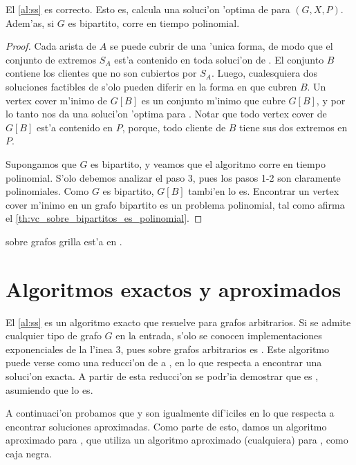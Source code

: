 \begin{theorem}
El \autoref{al:ss} es correcto. Esto es, calcula una soluci'on 'optima de  para $(G, X, P)$. Adem'as, si $G$ es bipartito, corre en tiempo polinomial.
\begin{proof}
Cada arista de $A$ se puede cubrir de una 'unica forma, de modo que el conjunto de extremos $S_A$ est'a contenido en toda soluci'on de . El conjunto $B$ contiene los clientes que no son cubiertos por $S_A$. Luego, cualesquiera dos soluciones factibles de  s'olo pueden diferir en la forma en que cubren $B$. Un vertex cover m'inimo de $G[B]$ es un conjunto m'inimo que cubre $G[B]$, y por lo tanto nos da una soluci'on 'optima para . Notar que todo vertex cover de $G[B]$ est'a contenido en $P$, porque, todo cliente de $B$ tiene sus dos extremos en $P$.

Supongamos que $G$ es bipartito, y veamos que el algoritmo corre en tiempo polinomial. S'olo debemos analizar el paso 3, pues los pasos 1-2 son claramente polinomiales. Como $G$ es bipartito, $G[B]$ tambi'en lo es. Encontrar un vertex cover m'inimo en un grafo bipartito es un problema polinomial, tal como afirma el \autoref{th:vc_sobre_bipartitos_es_polinomial}.
\end{proof}
\end{theorem}

\begin{corollary}
 sobre grafos grilla est'a en .
\end{corollary}

\section{Algoritmos exactos y aproximados}

El \autoref{al:ss} es un algoritmo exacto que resuelve  para grafos arbitrarios. Si se admite cualquier tipo de grafo $G$ en la entrada, s'olo se conocen implementaciones exponenciales de la l'inea 3, pues  sobre grafos arbitrarios es . Este algoritmo puede verse como una reducci'on de  a , en lo que respecta a encontrar una soluci'on exacta. A partir de esta reducci'on se podr'ia demostrar que  es , asumiendo que  lo es.

A continuaci'on probamos que  y  son igualmente dif'iciles en lo que respecta a encontrar soluciones aproximadas. Como parte de esto, damos un algoritmo aproximado para , que utiliza un algoritmo aproximado (cualquiera) para , como caja negra.

